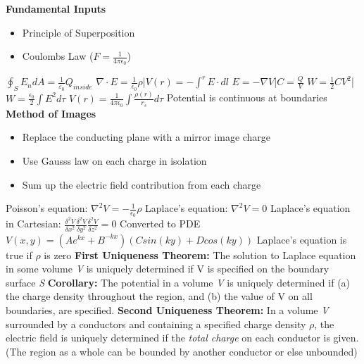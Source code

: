 \documentclass[1pt]{report}
\begin{document}
\begin{multicols}{3}
\textbf{Fundamental Inputs}
\begin{itemize}[noitemsep]
\item Principle of Superposition
\item Coulombs Law ($F=\frac{1}{4\pi\epsilon_0}$)
\end{itemize}
\begin{flushleft}
$\oint_S {E_n dA = \frac{1}{{\varepsilon _0 }}} Q_{inside}$
\linebreak
$\nabla\cdot E=\frac{1}{\epsilon_0}\rho$|$V(r)=-\int^rE\cdot dl$
\linebreak
$E=-\nabla V$|$C=\frac{Q}{V}$
\linebreak
$W=\frac{1}{2}CV^2$|$W=\frac{\epsilon_0}{2}\int E^2d\tau$
\linebreak
$V(r)=\frac{1}{4\pi\epsilon_0}\int\frac{\rho(r)}{r_s}d\tau$
\linebreak
Potential is continuous at boundaries 
\textbf{Method of Images}
\begin{itemize}[noitemsep]
\item Replace the conducting plane with a mirror image charge
\item Use Gausss law on each charge in isolation
\item Sum up the electric field contribution from each charge
\end{itemize}
Poisson's equation:
$\nabla^2V=-\frac{1}{\epsilon_0}\rho$
\linebreak
Laplace's equation:
$\nabla^2V=0$
\linebreak
Laplace's equation in Cartesian:
$\frac{\delta^2V}{\delta x^2}\frac{\delta^2V}{\delta y^2}\frac{\delta^2V}{\delta z^2}=0$
\linebreak
Converted to PDE
\linebreak
$V(x,y)=(Ae^{kx}+B^{-kx})(Csin(ky)+Dcos(ky))$
Laplace's equation is true if $\rho$ is zero
\linebreak
\textbf{First Uniqueness Theorem:}
The solution to Laplace equation in some volume \textit{V} is uniquely determined if V is specified on the boundary surface \textit{S}
\textbf{Corollary:}
The potential in a volume \textit{V} is uniquely determined if (a) the charge density throughout the region, and (b) the value of V on all boundaries, are specified. 
\textbf{Second Uniqueness Theorem:}
In a volume \textit{V} surrounded by a conductors and containing a specified charge density \textit{$\rho$}, the electric field is uniquely determined if the \textit{total charge} on each conductor is given. (The region as a whole can be bounded by another conductor or else unbounded)

\end{flushleft}
\end{multicols}
\end{document}
